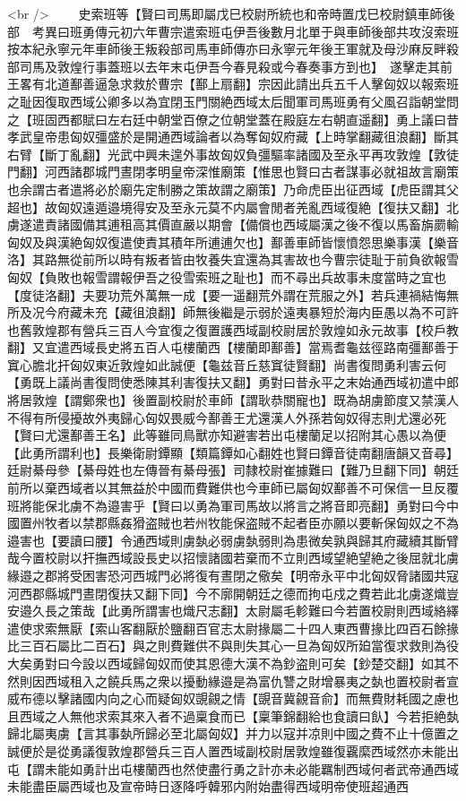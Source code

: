 <br />
　　史索班等【賢曰司馬即屬戊巳校尉所統也和帝時置戊巳校尉鎮車師後部　考異曰班勇傳元初六年曹宗遣索班屯伊吾後數月北單于與車師後部共攻沒索班按本紀永寧元年車師後王叛殺部司馬車師傳亦曰永寧元年後王軍就及母沙麻反畔殺部司馬及敦煌行事蓋班以去年末屯伊吾今春見殺或今春奏事方到也】　遂擊走其前王畧有北道鄯善逼急求救於曹宗【鄯上扇翻】宗因此請出兵五千人擊匈奴以報索班之耻因復取西域公卿多以為宜閉玉門關絶西域太后聞軍司馬班勇有父風召詣朝堂問之【班固西都賦曰左右廷中朝堂百僚之位朝堂蓋在殿庭左右朝直遥翻】勇上議曰昔孝武皇帝患匈奴彊盛於是開通西域論者以為奪匈奴府藏【上時掌翻藏徂浪翻】斷其右臂【斷丁亂翻】光武中興未遑外事故匈奴負彊驅率諸國及至永平再攻敦煌【敦徒門翻】河西諸郡城門晝閉孝明皇帝深惟廟策【惟思也賢曰古者謀事必就祖故言廟策也余謂古者遣將必於廟先定制勝之策故謂之廟策】乃命虎臣出征西域【虎臣謂其父超也】故匈奴遠遁邉境得安及至永元莫不内屬會閒者羌亂西域復絶【復扶又翻】北虜遂遣責諸國備其逋租高其價直嚴以期會【備償也西域屬漢之後不復以馬畜旃罽輸匈奴及與漢絶匈奴復遣使責其積年所逋逋欠也】鄯善車師皆懷憤怨思樂事漢【樂音洛】其路無從前所以時有叛者皆由牧養失宜還為其害故也今曹宗徒耻于前負欲報雪匈奴【負敗也報雪謂報伊吾之役雪索班之耻也】而不尋出兵故事未度當時之宜也【度徒洛翻】夫要功荒外萬無一成【要一遥翻荒外謂在荒服之外】若兵連禍結悔無所及况今府藏未充【藏徂浪翻】師無後繼是示弱於遠夷暴短於海内臣愚以為不可許也舊敦煌郡有營兵三百人今宜復之復置護西域副校尉居於敦煌如永元故事【校戶教翻】又宜遣西域長史將五百人屯樓蘭西【樓蘭即鄯善】當焉耆龜兹徑路南彊鄯善于窴心膽北扞匈奴東近敦煌如此誠便【龜兹音丘慈窴徒賢翻】尚書復問勇利害云何【勇既上議尚書復問使悉陳其利害復扶又翻】勇對曰昔永平之末始通西域初遣中郎將居敦煌【謂鄭衆也】後置副校尉於車師【謂耿恭關寵也】既為胡虜節度又禁漢人不得有所侵擾故外夷歸心匈奴畏威今鄯善王尤還漢人外孫若匈奴得志則尤還必死【賢曰尤還鄯善王名】此等雖同鳥獸亦知避害若出屯樓蘭足以招附其心愚以為便【此勇所謂利也】長樂衛尉鐔顯【類篇鐔如心翻姓也賢曰鐔音徒南翻唐韻又音尋】廷尉綦母參【綦母姓也左傳晉有綦母張】司隸校尉崔據難曰【難乃旦翻下同】朝廷前所以棄西域者以其無益於中國而費難供也今車師已屬匈奴鄯善不可保信一旦反覆班將能保北虜不為邉害乎【賢曰以勇為軍司馬故以將言之將音即亮翻】勇對曰今中國置州牧者以禁郡縣姦猾盗賊也若州牧能保盗賊不起者臣亦願以要斬保匈奴之不為邉害也【要讀曰腰】令通西域則虜埶必弱虜埶弱則為患微矣孰與歸其府藏續其斷臂哉今置校尉以扞撫西域設長史以招懷諸國若棄而不立則西域望絶望絶之後屈就北虜緣邉之郡將受困害恐河西城門必將復有晝閉之儆矣【明帝永平中北匈奴脅諸國共寇河西郡縣城門晝閉復扶又翻下同】今不廓開朝廷之德而拘屯戍之費若此北虜遂熾豈安邉久長之策哉【此勇所謂害也熾尺志翻】太尉屬毛軫難曰今若置校尉則西域絡繹遣使求索無厭【索山客翻厭於鹽翻百官志太尉掾屬二十四人東西曹掾比四百石餘掾比三百石屬比二百石】與之則費難供不與則失其心一旦為匈奴所廹當復求救則為役大矣勇對曰今設以西域歸匈奴而使其恩德大漢不為鈔盗則可矣【鈔楚交翻】如其不然則因西域租入之饒兵馬之衆以擾動緣邉是為富仇讐之財增暴夷之埶也置校尉者宣威布德以擊諸國内向之心而疑匈奴覬覦之情【覬音冀覦音俞】而無費財耗國之慮也且西域之人無他求索其來入者不過稟食而已【稟筆錦翻給也食讀曰飤】今若拒絶埶歸北屬夷虜【言其事埶所歸必至北屬匈奴】并力以寇并凉則中國之費不止十億置之誠便於是從勇議復敦煌郡營兵三百人置西域副校尉居敦煌雖復覊縻西域然亦未能出屯【謂未能如勇計出屯樓蘭西也然使盡行勇之計亦未必能羈制西域何者武帝通西域未能盡臣屬西域也及宣帝時日逐降呼韓邪内附始盡得西域明帝使班超通西